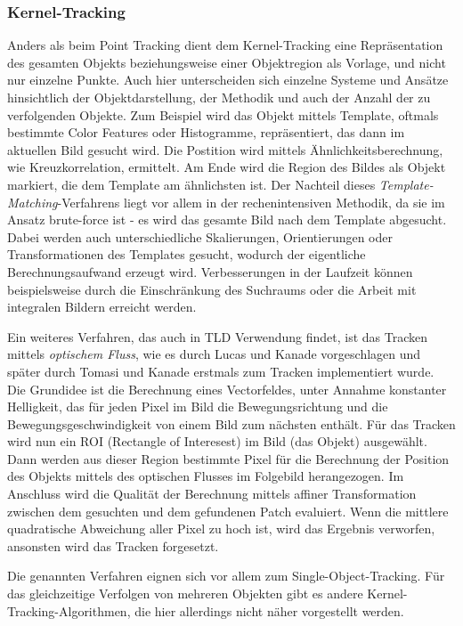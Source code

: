 \subsubsection{Kernel-Tracking}
Anders als beim Point Tracking dient dem Kernel-Tracking eine Repräsentation des gesamten Objekts beziehungsweise einer Objektregion als Vorlage, und nicht nur einzelne Punkte. Auch hier unterscheiden sich einzelne Systeme und Ansätze hinsichtlich der Objektdarstellung, der Methodik und auch der Anzahl der zu verfolgenden Objekte. Zum Beispiel wird das Objekt mittels Template, oftmals bestimmte Color Features oder Histogramme, repräsentiert, das dann im aktuellen Bild gesucht wird. Die Postition wird mittels Ähnlichkeitsberechnung, wie Kreuzkorrelation, ermittelt. Am Ende wird die Region des Bildes als Objekt markiert, die dem Template am ähnlichsten ist. Der Nachteil dieses \textit{Template-Matching}-Verfahrens liegt vor allem in der rechenintensiven Methodik, da sie im Ansatz brute-force ist - es wird das gesamte Bild nach dem Template abgesucht. Dabei werden auch unterschiedliche Skalierungen, Orientierungen oder Transformationen des Templates gesucht, wodurch der eigentliche Berechnungsaufwand erzeugt wird. Verbesserungen in der Laufzeit können beispielsweise durch die Einschränkung des Suchraums oder die Arbeit mit integralen Bildern\cite{INT} erreicht werden.

Ein weiteres Verfahren, das auch in TLD Verwendung findet, ist das Tracken mittels \textit{optischem Fluss}, wie es durch Lucas und Kanade\cite{OPT} vorgeschlagen und später durch Tomasi und Kanade\cite{LKT} erstmals zum Tracken implementiert wurde. Die Grundidee ist die Berechnung eines Vectorfeldes, unter Annahme konstanter Helligkeit, das für jeden Pixel im Bild die Bewegungsrichtung und die Bewegungsgeschwindigkeit von einem Bild zum nächsten enthält. Für das Tracken wird nun ein ROI (Rectangle of Interesest) im Bild (das Objekt) ausgewählt. Dann werden aus dieser Region bestimmte Pixel für die Berechnung der Position des Objekts mittels des optischen Flusses im Folgebild herangezogen. Im Anschluss wird die Qualität der Berechnung mittels affiner Transformation zwischen dem gesuchten und dem gefundenen Patch evaluiert. Wenn die mittlere quadratische Abweichung aller Pixel zu hoch ist, wird das Ergebnis verworfen, ansonsten wird das Tracken forgesetzt.

Die genannten Verfahren eignen sich vor allem zum Single-Object-Tracking. Für das gleichzeitige Verfolgen von mehreren Objekten gibt es andere Kernel-Tracking-Algorithmen, die hier allerdings nicht näher vorgestellt werden.

